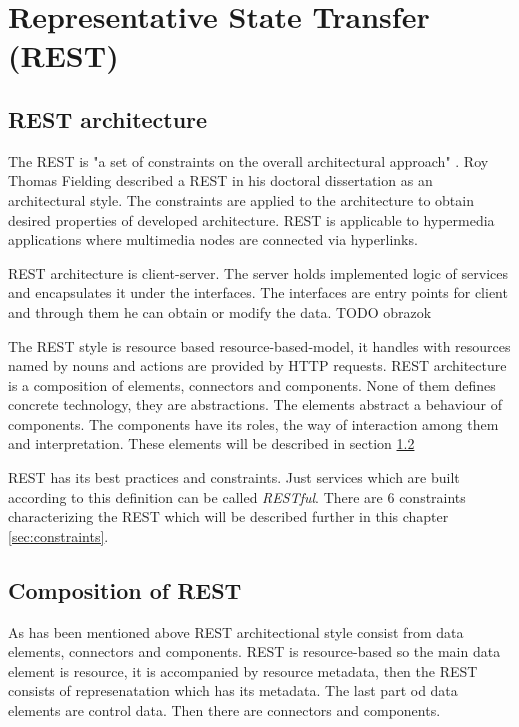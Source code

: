 \chapter{Representative State Transfer (REST)}
\label{chap:rest}

\section{REST architecture}
\label{sec:rest-architecture}

The REST is "a set of constraints on the overall architectural approach" \cite{agile-architecture}. Roy Thomas Fielding described a REST in his doctoral dissertation as an architectural style. The constraints are applied to the architecture to obtain desired properties of developed architecture. REST is applicable to \gls{hypermedia}  applications where multimedia nodes are connected via hyperlinks.

REST architecture is client-server. The server holds implemented logic of services and encapsulates it under the interfaces. The interfaces are entry points for client and through them he can obtain or modify the data. TODO obrazok

The REST style is resource based \gls{resource-based-model}, it handles with resources named by nouns and actions are provided by HTTP requests. 
REST architecture is a composition of elements, connectors and components. None of them defines concrete technology, they are abstractions. The elements abstract a behaviour of components. The components have its roles, the way of interaction among them and interpretation. These elements will be described in section \ref{sec:rest-composition}

REST has its best practices and constraints. Just services which are built according to this definition can be called \emph{RESTful}. There are 6 constraints characterizing the REST which will be described further in this chapter \ref{sec:constraints}.

\section{Composition of REST}
\label{sec:rest-composition}
As has been mentioned above REST architectional style consist from data elements, connectors and components. REST is resource-based so the main data element is resource, it is accompanied by resource metadata, then the REST consists of represenatation which has its metadata. The last part od data elements are control data. Then there are connectors and components.

